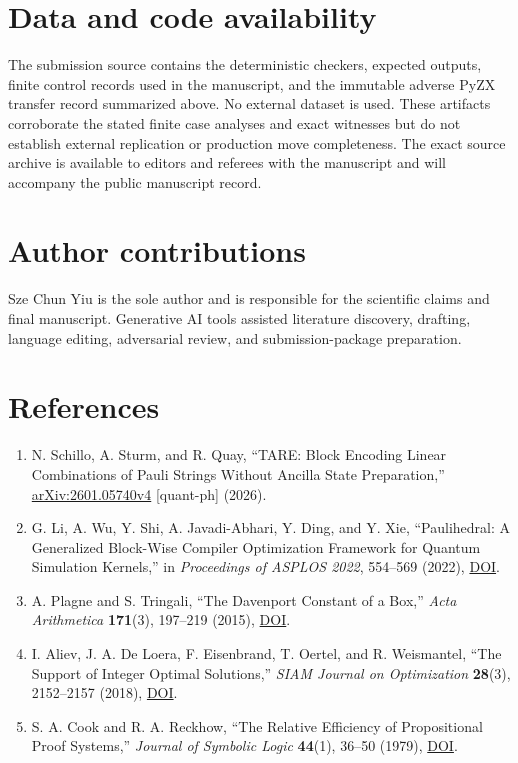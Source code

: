 \documentclass[11pt]{article}
\providecommand{\tightlist}{\setlength{\itemsep}{0pt}\setlength{\parskip}{0pt}}
\begin{document}
\hypertarget{data-and-code-availability}{%
\section*{Data and code availability}\label{data-and-code-availability}}

The submission source contains the deterministic checkers, expected outputs, finite control records used in the manuscript, and the immutable adverse PyZX transfer record summarized above. No external dataset is used. These artifacts corroborate the stated finite case analyses and exact witnesses but do not establish external replication or production move completeness. The exact source archive is available to editors and referees with the manuscript and will accompany the public manuscript record.

\hypertarget{author-contributions}{%
\section*{Author contributions}\label{author-contributions}}

Sze Chun Yiu is the sole author and is responsible for the scientific claims and final manuscript. Generative AI tools assisted literature discovery, drafting, language editing, adversarial review, and submission-package preparation.

\hypertarget{references}{%
\section*{References}\label{references}}

\begin{enumerate}
\def\labelenumi{\arabic{enumi}.}
\tightlist
\item
  N. Schillo, A. Sturm, and R. Quay, ``TARE: Block Encoding Linear Combinations of Pauli Strings Without Ancilla State Preparation,'' \href{https://arxiv.org/abs/2601.05740v4}{arXiv:2601.05740v4} {[}quant-ph{]} (2026).
\item
  G. Li, A. Wu, Y. Shi, A. Javadi-Abhari, Y. Ding, and Y. Xie, ``Paulihedral: A Generalized Block-Wise Compiler Optimization Framework for Quantum Simulation Kernels,'' in \emph{Proceedings of ASPLOS 2022}, 554--569 (2022), \href{https://doi.org/10.1145/3503222.3507715}{DOI}.
\item
  A. Plagne and S. Tringali, ``The Davenport Constant of a Box,'' \emph{Acta Arithmetica} \textbf{171}(3), 197--219 (2015), \href{https://doi.org/10.4064/aa171-3-1}{DOI}.
\item
  I. Aliev, J. A. De Loera, F. Eisenbrand, T. Oertel, and R. Weismantel, ``The Support of Integer Optimal Solutions,'' \emph{SIAM Journal on Optimization} \textbf{28}(3), 2152--2157 (2018), \href{https://doi.org/10.1137/17M1162792}{DOI}.
\item
  S. A. Cook and R. A. Reckhow, ``The Relative Efficiency of Propositional Proof Systems,'' \emph{Journal of Symbolic Logic} \textbf{44}(1), 36--50 (1979), \href{https://doi.org/10.2307/2273702}{DOI}.
\end{enumerate}
\end{document}

